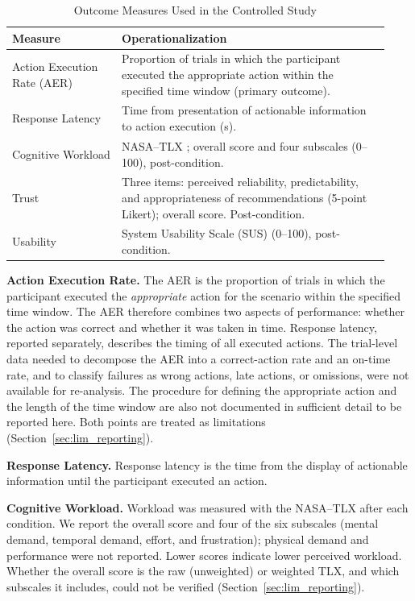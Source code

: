 \documentclass[journal]{IEEEtran}
\theoremstyle{plain}
\theoremstyle{definition}
\begin{document}
    \begin{table}[t]
        \caption{Outcome Measures Used in the Controlled Study}
        \label{tab:measures}
        \centering
        \begin{tabular}{p{0.27\linewidth}p{0.66\linewidth}}
            \toprule
            \textbf{Measure} & \textbf{Operationalization} \\
            \midrule
            Action Execution Rate (AER) & Proportion of trials in which the participant executed the appropriate action within the specified time window (primary outcome). \\
            Response Latency & Time from presentation of actionable information to action execution (s). \\
            Cognitive Workload & NASA--TLX \cite{Hart1988}; overall score and four subscales (0--100), post-condition. \\
            Trust & Three items: perceived reliability, predictability, and appropriateness of recommendations (5-point Likert); overall score. Post-condition. \\
            Usability & System Usability Scale (SUS) \cite{Brooke1996} (0--100), post-condition. \\
            \bottomrule
        \end{tabular}
    \end{table}

    \textbf{Action Execution Rate.}
    The AER is the proportion of trials in which the participant executed the \emph{appropriate} action for the scenario within the specified time window. The AER therefore combines two aspects of performance: whether the action was correct and whether it was taken in time. Response latency, reported separately, describes the timing of all executed actions. The trial-level data needed to decompose the AER into a correct-action rate and an on-time rate, and to classify failures as wrong actions, late actions, or omissions, were not available for re-analysis. The procedure for defining the appropriate action and the length of the time window are also not documented in sufficient detail to be reported here. Both points are treated as limitations (Section~\ref{sec:lim_reporting}).

    \textbf{Response Latency.}
    Response latency is the time from the display of actionable information until the participant executed an action.

    \textbf{Cognitive Workload.}
    Workload was measured with the NASA--TLX \cite{Hart1988} after each condition. We report the overall score and four of the six subscales (mental demand, temporal demand, effort, and frustration); physical demand and performance were not reported. Lower scores indicate lower perceived workload. Whether the overall score is the raw (unweighted) or weighted TLX, and which subscales it includes, could not be verified (Section~\ref{sec:lim_reporting}).
\end{document}
